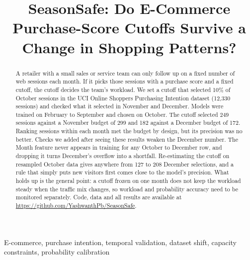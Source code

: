 \documentclass[conference]{IEEEtran}
\begin{document}
\title{SeasonSafe: Do E-Commerce Purchase-Score Cutoffs Survive a Change in Shopping Patterns?}

\author{
}

\maketitle

\begin{abstract}
A retailer with a small sales or service team can only follow up on a fixed number of web sessions
each month. If it picks those sessions with a purchase score and a fixed cutoff, the cutoff decides
the team's workload. We set a cutoff that selected 10\% of October sessions in the UCI Online Shoppers
Purchasing Intention dataset (12,330 sessions) and checked what it selected in November and December.
Models were trained on February to September and chosen on October. The cutoff selected 249 sessions
against a November budget of 299 and 182 against a December budget of 172. Ranking sessions within each
month met the budget by design, but its precision was no better. Checks we added after seeing these
results weaken the December number. The Month feature never appears in training for any October to
December row, and dropping it turns December's overflow into a shortfall. Re-estimating the cutoff on
resampled October data gives anywhere from 127 to 208 December selections, and a rule that simply puts
new visitors first comes close to the model's precision. What holds up is the general point: a cutoff
frozen on one month does not keep the workload steady when the traffic mix changes, so workload and
probability accuracy need to be monitored separately. Code, data and all results are available at
\url{https://github.com/YashwanthPb/SeasonSafe}.
\end{abstract}

\begin{IEEEkeywords}
E-commerce, purchase intention, temporal validation, dataset shift, capacity constraints, probability calibration
\end{IEEEkeywords}
\end{document}
